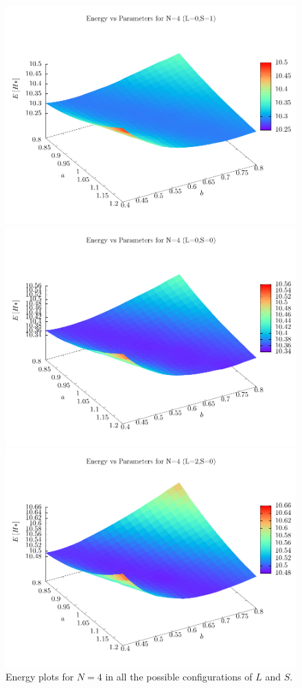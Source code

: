 \begin{figure}[h]
  \begin{minipage}{0.5\textwidth}
    \centering
    \includegraphics[width=\textwidth]{Graphics/surf401.pdf}
  \end{minipage}
  \begin{minipage}{0.5\textwidth}
    \centering
    \includegraphics[width=\textwidth]{Graphics/surf400.pdf}
  \end{minipage}
  \begin{center}
    \includegraphics[width=.5\textwidth]{Graphics/surf420.pdf}
    \caption{Energy plots for $N=4$ in all the possible configurations of $L$ and $S$.}
    \label{varplot4}
  \end{center}
\end{figure}

